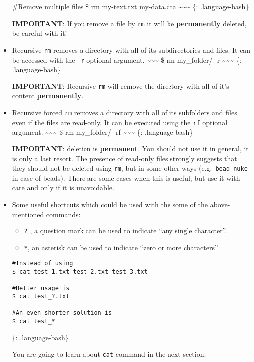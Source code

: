 \documentclass[
]{book}
\providecommand{\tightlist}{%
  \setlength{\itemsep}{0pt}\setlength{\parskip}{0pt}}
\begin{document}
\begin{itemize}
  \#Remove multiple files
  \$ rm my-text.txt my-data.dta
  \textasciitilde\textasciitilde\textasciitilde{}
  \{: .language-bash\}

  \textbf{IMPORTANT}: If you remove a file by \texttt{rm} it will be \textbf{permanently} deleted, be careful with it!
\item
  Recursive \texttt{rm} removes a directory with all of its subdirectories and files. It can be accessed with the \texttt{-r} optional argument.
  \textasciitilde\textasciitilde\textasciitilde{}
  \$ rm my\_folder/ -r
  \textasciitilde\textasciitilde\textasciitilde{}
  \{: .language-bash\}

  \textbf{IMPORTANT}: Recursive \texttt{rm} will remove the directory with all of it's content \textbf{permanently}.
\item
  Recursive forced \texttt{rm} removes a directory with all of its subfolders and files even if the files are read-only. It can be executed using the \texttt{rf} optional argument.
  \textasciitilde\textasciitilde\textasciitilde{}
  \$ rm my\_folder/ -rf
  \textasciitilde\textasciitilde\textasciitilde{}
  \{: .language-bash\}

  \textbf{IMPORTANT}: deletion is \textbf{permanent}. You should not use it in general, it is only a last resort. The presence of read-only files strongly suggests that they should not be deleted using \texttt{rm}, but in some other ways (e.g.~\texttt{bead\ nuke} in case of beads). There are some cases when this is useful, but use it with care and only if it is unavoidable.
\item
  Some useful shortcuts which could be used with the some of the above-mentioned commands:

  \begin{itemize}
  \tightlist
  \item
    \texttt{?} , a question mark can be used to indicate ``any single character''.
  \item
    \texttt{*}, an asterisk can be used to indicate ``zero or more characters''.
  \end{itemize}

\begin{verbatim}
#Instead of using 
$ cat test_1.txt test_2.txt test_3.txt

#Better usage is
$ cat test_?.txt

#An even shorter solution is
$ cat test_*  
\end{verbatim}

  \{: .language-bash\}

  You are going to learn about \texttt{cat} command in the next section.
\end{itemize}
\end{document}
